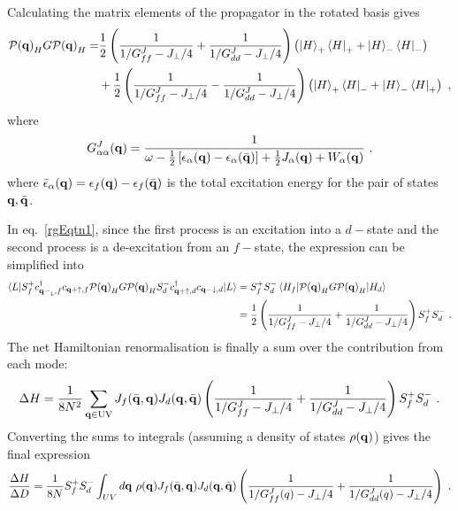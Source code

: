 \documentclass[%
reprint,
superscriptaddress,
groupedaddress,
superscriptaddress,
onecolumn,
10pt
]{revtex4-2}
\begin{document}
Calculating the matrix elements of the propagator in the rotated basis gives
\begin{equation}\begin{aligned}\label{PGP}
	\mathcal{P({\bf q})}_H G \mathcal{P({\bf q})}_H =& \frac{1}{2}\left(\frac{1}{1/G^J_{ff} - J_\perp/4} + \frac{1}{1/G^J_{dd} - J_\perp/4}\right)\left(\ket{H}_+\bra{H}_+ + \ket{H}_-\bra{H}_-\right)\\
													&+ \frac{1}{2}\left(\frac{1}{1/G^J_{ff} - J_\perp/4} - \frac{1}{1/G^J_{dd} - J_\perp/4}\right)\left(\ket{H}_+\bra{H}_- + \ket{H}_-\bra{H}_+\right)~,
\end{aligned}\end{equation}
where
\begin{equation}\begin{aligned}
	G^{J}_{\alpha\alpha}({\bf q}) = \frac{1}{\omega - \frac{1}{2}\left[\epsilon_\alpha({\bf q}) - \epsilon_\alpha(\bar{\bf q})\right] + \frac{1}{2}J_\alpha({\bf q}) + W_\alpha({\bf q})}~.
\end{aligned}\end{equation}
where \(\bar\epsilon_\alpha({\bf q}) = \epsilon_f({\bf q}) - \epsilon_f(\bar{\bf q})\) is the total excitation energy for the pair of states \({\bf q},\bar{\bf q}\).

In eq.~\ref{rgEqtn1}, since the first process is an excitation into a \(d-\)state and the second process is a de-excitation from an \(f-\)state, the expression can be simplified into
\begin{equation}\begin{aligned}\label{rgEqtn2}
	\braket{L | S_f^+ c^\dagger_{{\bf q-}_\downarrow,f}c_{{\bf q+}\uparrow,f} \mathcal{P({\bf q})}_H G \mathcal{P({\bf q})}_H S_d^- c^\dagger_{{\bf q+}\uparrow,d}c_{{\bf q-}\downarrow,d} | L } &= S_f^+ S_d^- \braket{H_f | \mathcal{P({\bf q})}_H G \mathcal{P({\bf q})}_H | H_d} \\
																																																 &= \frac{1}{2}\left(\frac{1}{1/G^J_{ff} - J_\perp/4} + \frac{1}{1/G^J_{dd} - J_\perp/4}\right) S_f^+ S_d^-~.
\end{aligned}\end{equation}
The net Hamiltonian renormalisation is finally a sum over the contribution from each mode:
\begin{equation}\begin{aligned}
	\Delta H = \frac{1}{8N^2} \sum_{{\bf q} \in \text{UV}}J_f(\bar{\bf q},{\bf q}) J_d({\bf q},\bar{\bf q})\left(\frac{1}{1/G^J_{ff} - J_\perp/4} + \frac{1}{1/G^J_{dd} - J_\perp/4}\right) S_f^+ S_d^-~.
\end{aligned}\end{equation}
Converting the sums to integrals (assuming a density of states \(\rho({\bf q})\)) gives the final expression
\begin{equation}\begin{aligned}
	\frac{\Delta H}{\Delta D} = \frac{1}{8N} S_f^+ S_d^-\int_{UV} d{\bf q} ~\rho({\bf q}) J_f(\bar{\bf q},{\bf q}) J_d({\bf q},\bar{\bf q})\left(\frac{1}{1/G^J_{ff}(q) - J_\perp/4} + \frac{1}{1/G^J_{dd}(q) - J_\perp/4}\right)~.
\end{aligned}\end{equation}
\end{document}
